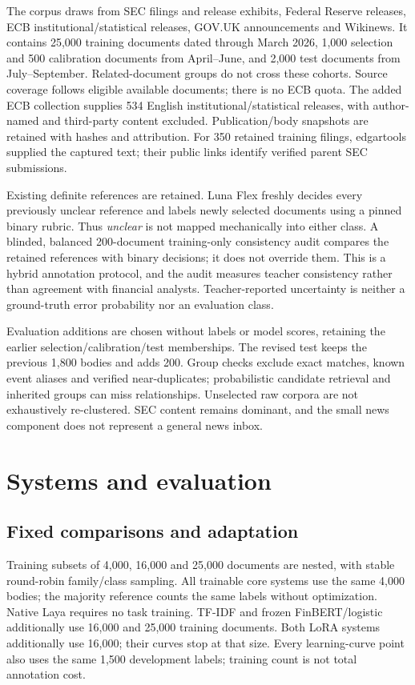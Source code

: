 \documentclass[11pt,a4paper]{article}
\begin{document}
The corpus draws from SEC filings and release exhibits, Federal Reserve releases,
ECB institutional/statistical releases, GOV.UK announcements and Wikinews.
It contains 25,000 training documents dated through March 2026, 1,000 selection
and 500 calibration documents from April--June, and 2,000 test documents from
July--September. Related-document groups do not cross these cohorts. Source
coverage follows eligible available documents; there is no ECB quota.
The added ECB collection supplies 534 English institutional/statistical releases,
with author-named and third-party content excluded. Publication/body snapshots
are retained with hashes and attribution.
For 350 retained training filings, edgartools supplied the captured text;
their public links identify verified parent SEC submissions.

Existing definite references are retained. Luna Flex freshly decides every
previously unclear reference and labels newly selected documents using a pinned
binary rubric. Thus \emph{unclear} is not mapped mechanically into either class.
A blinded, balanced 200-document training-only consistency audit compares the
retained references with binary decisions; it does not override them. This is a
hybrid annotation protocol, and the audit measures teacher consistency rather
than agreement with financial analysts. Teacher-reported uncertainty is neither
a ground-truth error probability nor an evaluation class.

Evaluation additions are chosen without labels or model scores, retaining the
earlier selection/calibration/test memberships. The revised test keeps the
previous 1,800 bodies and adds 200. Group checks exclude exact matches,
known event aliases and verified near-duplicates; probabilistic candidate
retrieval and inherited groups can miss relationships. Unselected raw corpora
are not exhaustively re-clustered. SEC content remains dominant, and the small
news component does not represent a general news inbox.



\section{Systems and evaluation}
\label{sec:methods}
\subsection{Fixed comparisons and adaptation}
Training subsets of 4,000, 16,000 and 25,000 documents are nested, with stable
round-robin family/class sampling. All trainable core systems use the same
4,000 bodies; the majority reference counts the same labels without optimization. Native Laya
requires no task training. TF-IDF and frozen FinBERT/logistic additionally use
16,000 and 25,000 training documents. Both LoRA systems additionally use 16,000;
their curves stop at that size. Every learning-curve point also
uses the same 1,500 development labels; training count is not total annotation cost.
\end{document}
